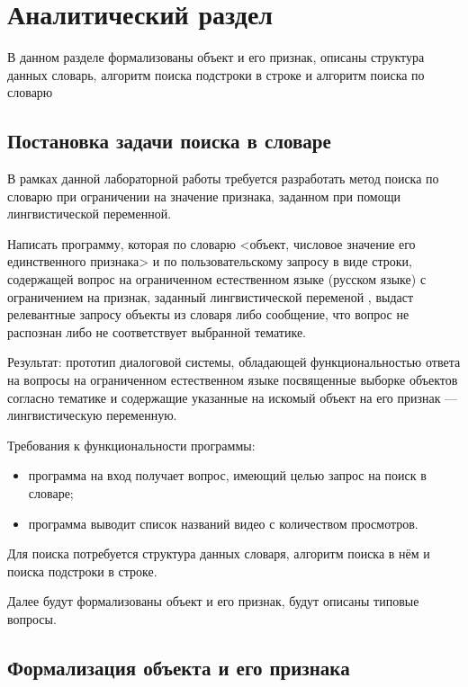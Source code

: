 \chapter{Аналитический раздел}

В данном разделе формализованы объект и его признак, описаны структура данных словарь, алгоритм поиска подстроки в строке и алгоритм поиска по словарю

\section{Постановка задачи поиска в словаре}

В рамках данной лабораторной работы требуется разработать метод поиска по словарю при ограничении на значение признака, заданном при помощи лингвистической переменной. 

Написать программу, которая по словарю <объект, числовое значение его единственного признака> и по пользовательскому запросу в виде строки, содержащей вопрос на ограниченном естественном языке (русском языке) с ограничением на признак, заданный лингвистической переменой , выдаст релевантные запросу объекты из словаря либо сообщение, что вопрос не распознан либо не соответствует выбранной тематике.

Результат: прототип диалоговой системы, обладающей функциональностью ответа на вопросы на ограниченном естественном языке посвященные выборке объектов согласно тематике и содержащие указанные на искомый объект на его признак --- лингвистическую переменную.

Требования к функциональности программы:
\begin{itemize}[label=---]
\item программа на вход получает вопрос, имеющий целью запрос на поиск в словаре;
	
\item программа выводит список названий видео с количеством просмотров.
\end{itemize}

Для поиска потребуется структура данных словаря, алгоритм поиска в нём и поиска подстроки в строке.

Далее будут формализованы объект и его признак, будут описаны типовые вопросы.

\section{Формализация объекта и его признака}

